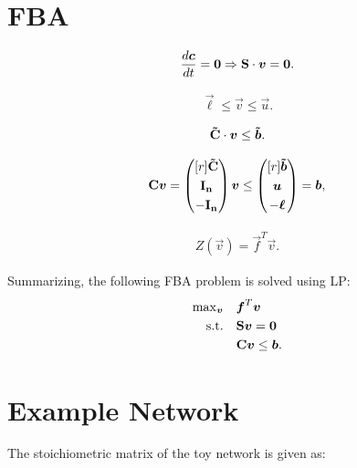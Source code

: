 


\pagestyle{empty}

\section*{FBA}
\begin{align}\label{eq: SteadyState}
	\frac{d\boldsymbol{c}}{dt} = \boldsymbol{0} \Rightarrow  {\bf S} \cdot \boldsymbol{v} = \boldsymbol{0}.
\end{align}

\begin{align}\label{eq:FluxLimits}
	\vec{\ell} \leq \vec{v} \leq \vec{u}.
\end{align}

\begin{align}\label{eq:AdditionalInequalityConstraints}
	{\bf \tilde{C}} \cdot \boldsymbol{v} \leq \boldsymbol{\tilde{b}}.
\end{align}

\begin{align}\label{eq:constraints}\renewcommand*{\arraystretch}{\matrixLineSpacing}
	\mat{C} \vec{v} = \begin{pmatrix}[r]
		\mat{\tilde{C}} \\ 
		\mat{I_n} \\
		-\mat{I_n}
	\end{pmatrix} \vec{v} \leq \begin{pmatrix}[r] \vec{\tilde{b}} \\ \vec{u} \\ -\vec{\ell} \end{pmatrix} = \vec{b},
\end{align}
 

\begin{align}\label{eq:objective}
Z(\vec{v}) = \vec{f}^T \vec{v}.
\end{align}

Summarizing,  the following FBA problem is solved using LP:
\begin{align}\label{eq:FBALP}
	\begin{array}{rl}
		\max_{\vec{v}} & \vec{f}^T \vec{v} \\
		\text{s.t.}& \mat{S} \vec{v} = \vec{0} \\
		& \mat{C} \vec{v} \leq \vec{b}.
	\end{array}
\end{align}


\section*{Example Network}
The stoichiometric matrix of the toy network is given as: 


